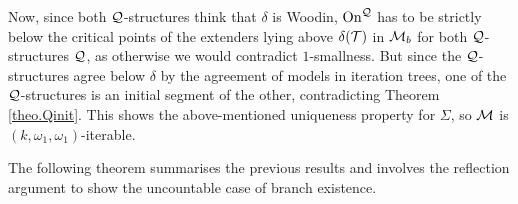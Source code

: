 {Now, since both $\operatorname{\mathcal{Q}}$-structures think that $\delta$ is Woodin, $\operatorname{On}^{\operatorname{\mathcal{Q}}}$ has to be strictly below the critical points of the extenders lying above $\delta(\operatorname{\mathcal{T}})$ in $\operatorname{\mathcal{M}}_b$ for both $\operatorname{\mathcal{Q}}$-structures $\operatorname{\mathcal{Q}}$, as otherwise we would contradict $1$-smallness. But since the $\operatorname{\mathcal{Q}}$-structures agree below $\delta$ by the agreement of models in iteration trees, one of the $\operatorname{\mathcal{Q}}$-structures is an initial segment of the other, contradicting Theorem \ref{theo.Qinit}. This shows the above-mentioned uniqueness property for $\Sigma$, so $\operatorname{\mathcal{M}}$ is $(k,\omega_1,\omega_1)$-iterable.
%
%
}


The following theorem summarises the previous results and involves the reflection argument to show the uncountable case of branch existence.

